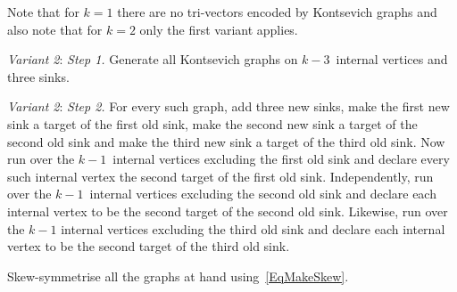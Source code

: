 \documentclass[a4paper]{jpconf}%
\theoremstyle{definition}
\newtheorem{example}{Example}%
\theoremstyle{remark}
\begin{document}
Note that for $k=1$ there are no tri\/-\/vectors encoded by Kontsevich graphs 
and also note that for $k=2$ 
only %
the first variant applies.

\smallskip\noindent%
{\textit{Variant 2}: \textit{Step 1.}} Generate all %
Kontsevich graphs on $k-3$~internal vertices and three sinks.

\noindent%
{\textit{Variant 2}: \textit{Step 2.}} For every such graph, add three new sinks, make the first new sink a target of the first old sink, 
make the second new sink a target of the second old sink and make the third 
new sink a target of the third old sink. Now run over the $k-1$~internal
 vertices excluding the first old sink and declare %
every such internal vertex 
the second target of the first old sink. Independently, run over the $k-1$~internal 
vertices excluding the second old sink and declare each internal vertex to be 
the second target of the second old sink. Likewise, run over the $k-1$ internal 
vertices excluding the third old sink and declare each internal vertex to 
be the second target of the third old sink.

{}
Skew\/-\/symmetrise all the graphs at hand using~\eqref{EqMakeSkew}.

\end{document}
